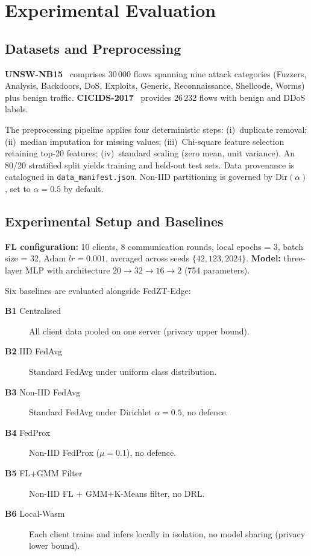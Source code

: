 \documentclass[iicol,sn-mathphys,Numbered]{sn-jnl}
\begin{document}
\section{Experimental Evaluation}\label{sec:experiments}

\subsection{Datasets and Preprocessing}\label{sec:data}
\textbf{UNSW-NB15}~\cite{moustafa2015} comprises 30\,000 flows spanning nine attack categories (Fuzzers, Analysis, Backdoors, DoS, Exploits, Generic, Reconnaissance, Shellcode, Worms) plus benign traffic. \textbf{CICIDS-2017}~\cite{sharafaldin2018} provides 26\,232 flows with benign and DDoS labels.

The preprocessing pipeline applies four deterministic steps: (i)~duplicate removal; (ii)~median imputation for missing values; (iii)~Chi-square feature selection retaining top-20 features; (iv)~standard scaling (zero mean, unit variance). An 80/20 stratified split yields training and held-out test sets. Data provenance is catalogued in \texttt{data\_manifest.json}. Non-IID partitioning is governed by $\text{Dir}(\alpha)$, set to $\alpha=0.5$ by default.

\subsection{Experimental Setup and Baselines}\label{sec:setup}
\textbf{FL configuration:} 10 clients, 8 communication rounds, local epochs = 3, batch size = 32, Adam $lr=0.001$, averaged across seeds $\{42, 123, 2024\}$. \textbf{Model:} three-layer MLP with architecture $20 \to 32 \to 16 \to 2$ (754 parameters).

Six baselines are evaluated alongside FedZT-Edge:
\begin{description}
  \item[\textbf{B1} Centralised] All client data pooled on one server (privacy upper bound).
  \item[\textbf{B2} IID FedAvg] Standard FedAvg under uniform class distribution.
  \item[\textbf{B3} Non-IID FedAvg] Standard FedAvg under Dirichlet $\alpha{=}0.5$, no defence.
  \item[\textbf{B4} FedProx] Non-IID FedProx ($\mu{=}0.1$), no defence.
  \item[\textbf{B5} FL+GMM Filter] Non-IID FL + GMM+K-Means filter, no DRL.
  \item[\textbf{B6} Local-Wasm] Each client trains and infers locally in isolation, no model sharing (privacy lower bound).
\end{description}
\end{document}
